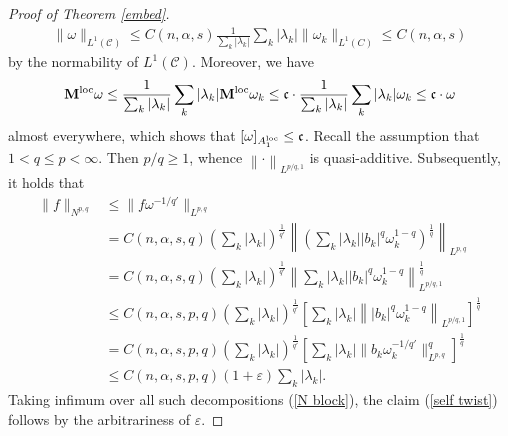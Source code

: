 \documentclass[10pt,reqno]{amsart}
\numberwithin{equation}{section}
\begin{document}
\begin{proof}[Proof of Theorem \ref{embed}]
\begin{align*}
\|\omega\|_{L^{1}(\mathcal{C})}\leq C(n,\alpha,s)\frac{1}{\sum_{k}|\lambda_{k}|}\sum_{k}|\lambda_{k}|\|\omega_{k}\|_{L^{1}(C)}\leq C(n,\alpha,s)
\end{align*}
by the normability of $L^{1}(\mathcal{C})$. Moreover, we have 
\begin{align*}
{\bf M}^{\rm loc}\omega\leq\frac{1}{\sum_{k}|\lambda_{k}|}\sum_{k}|\lambda_{k}|{\bf M}^{\rm loc}\omega_{k}\leq\mathfrak{c}\cdot\frac{1}{\sum_{k}|\lambda_{k}|}\sum_{k}|\lambda_{k}|\omega_{k}\leq\mathfrak{c}\cdot\omega
\end{align*}
almost everywhere, which shows that $[\omega]_{A_{1}^{\rm loc}}\leq\mathfrak{c}$. Recall the assumption that $1<q\leq p<\infty$. Then $p/q\geq 1$, whence $\left\|\cdot\right\|_{L^{p/q,1}}$ is quasi-additive. Subsequently, it holds that 
\begin{align*}
\|f\|_{N^{p,q}}&\leq\|f\omega^{-1/q'}\|_{L^{p,q}}\\
&=C(n,\alpha,s,q)\left(\sum_{k}|\lambda_{k}|\right)^{\frac{1}{q'}}\left\|\left(\sum_{k}|\lambda_{k}||b_{k}|^{q}\omega_{k}^{1-q}\right)^{\frac{1}{q}}\right\|_{L^{p,q}}\\
&=C(n,\alpha,s,q)\left(\sum_{k}|\lambda_{k}|\right)^{\frac{1}{q'}}\left\|\sum_{k}|\lambda_{k}||b_{k}|^{q}\omega_{k}^{1-q}\right\|_{L^{p/q,1}}^{\frac{1}{q}}\\
&\leq C(n,\alpha,s,p,q)\left(\sum_{k}|\lambda_{k}|\right)^{\frac{1}{q'}}\left[\sum_{k}|\lambda_{k}|\left\||b_{k}|^{q}\omega_{k}^{1-q}\right\|_{L^{p/q,1}}\right]^{\frac{1}{q}}\\
&=C(n,\alpha,s,p,q)\left(\sum_{k}|\lambda_{k}|\right)^{\frac{1}{q'}}\left[\sum_{k}|\lambda_{k}|\|b_{k}\omega_{k}^{-1/q'}\|_{L^{p,q}}^{q}\right]^{\frac{1}{q}}\\
&\leq C(n,\alpha,s,p,q)(1+\varepsilon)\sum_{k}|\lambda_{k}|.
\end{align*}
Taking infimum over all such decompositions (\ref{N block}), the claim (\ref{self twist}) follows by the arbitrariness of $\varepsilon$. 


\end{proof}
\end{document}
